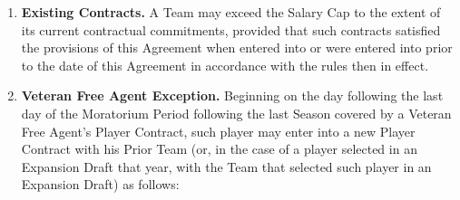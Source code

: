 \documentclass[
]{book}
\providecommand{\tightlist}{%
  \setlength{\itemsep}{0pt}\setlength{\parskip}{0pt}}
\begin{document}
\begin{enumerate}
\def\labelenumi{(\alph{enumi})}
\tightlist
\item
  \textbf{Existing Contracts.} A Team may exceed the Salary Cap to the extent of its current contractual commitments, provided that such contracts satisfied the provisions of this Agreement when entered into or were entered into prior to the date of this Agreement in accordance with the rules then in effect.
\item
  \textbf{Veteran Free Agent Exception.} Beginning on the day following the last day of the Moratorium Period following the last Season covered by a Veteran Free Agent's Player Contract, such player may enter into a new Player Contract with his Prior Team (or, in the case of a player selected in an Expansion Draft that year, with the Team that selected such player in an Expansion Draft) as follows:
\end{enumerate}
\end{document}
